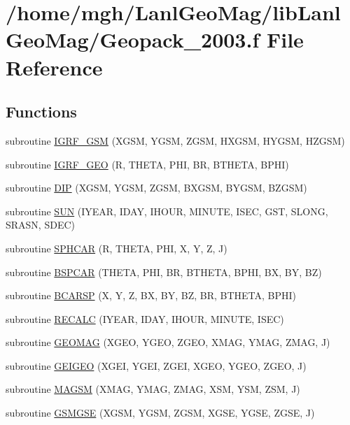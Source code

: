 \hypertarget{_geopack__2003_8f}{
\section{/home/mgh/LanlGeoMag/libLanlGeoMag/Geopack\_\-2003.f File Reference}
\label{_geopack__2003_8f}
}
\subsection*{Functions}
\begin{CompactItemize}
\item 
subroutine \hyperlink{_geopack__2003_8f_7ed9719f68132703108e5b59d36d7c03}{IGRF\_\-GSM} (XGSM, YGSM, ZGSM, HXGSM, HYGSM, HZGSM)
\item 
subroutine \hyperlink{_geopack__2003_8f_d3225aa14c76ab4531fcf76deb3c15e0}{IGRF\_\-GEO} (R, THETA, PHI, BR, BTHETA, BPHI)
\item 
subroutine \hyperlink{_geopack__2003_8f_a4095b06f000636e34e2581a92ed28f0}{DIP} (XGSM, YGSM, ZGSM, BXGSM, BYGSM, BZGSM)
\item 
subroutine \hyperlink{_geopack__2003_8f_59da55e19c09037b70bd65ec97a3567a}{SUN} (IYEAR, IDAY, IHOUR, MINUTE, ISEC, GST, SLONG, SRASN, SDEC)
\item 
subroutine \hyperlink{_geopack__2003_8f_51cbeafec4591bc974f865375cec3975}{SPHCAR} (R, THETA, PHI, X, Y, Z, J)
\item 
subroutine \hyperlink{_geopack__2003_8f_39f847a454b8691795bb0b0421de3a70}{BSPCAR} (THETA, PHI, BR, BTHETA, BPHI, BX, BY, BZ)
\item 
subroutine \hyperlink{_geopack__2003_8f_96aa3aaadaaa8312679747d9c48e3b51}{BCARSP} (X, Y, Z, BX, BY, BZ, BR, BTHETA, BPHI)
\item 
subroutine \hyperlink{_geopack__2003_8f_57fa81f55e16b42ac170dbf64e99a5b4}{RECALC} (IYEAR, IDAY, IHOUR, MINUTE, ISEC)
\item 
subroutine \hyperlink{_geopack__2003_8f_e0b60382c97039de9f797a776af33eb7}{GEOMAG} (XGEO, YGEO, ZGEO, XMAG, YMAG, ZMAG, J)
\item 
subroutine \hyperlink{_geopack__2003_8f_eacac87be2a894945521bf5ef2f9ef56}{GEIGEO} (XGEI, YGEI, ZGEI, XGEO, YGEO, ZGEO, J)
\item 
subroutine \hyperlink{_geopack__2003_8f_f5577c4fb7c2ae0b88ab96b884780760}{MAGSM} (XMAG, YMAG, ZMAG, XSM, YSM, ZSM, J)
\item 
subroutine \hyperlink{_geopack__2003_8f_44cb43398834cd0273a73264ea6e7057}{GSMGSE} (XGSM, YGSM, ZGSM, XGSE, YGSE, ZGSE, J)

\end{CompactItemize}
